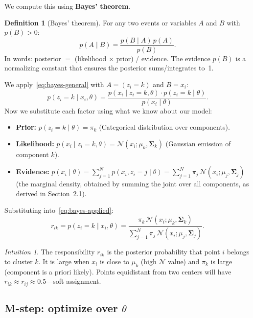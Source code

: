 \documentclass[11pt]{article}
\theoremstyle{definition}
\newtheorem{definition}{Definition}[section]
\theoremstyle{plain}
\theoremstyle{remark}
\newtheorem{intuition}{Intuition}[section]
\newcommand{\Sv}{\boldsymbol{\Sigma}}
\begin{document}
We compute this using \textbf{Bayes' theorem}.

\begin{definition}[Bayes' theorem]
For any two events or variables $A$ and $B$ with $p(B)>0$:
\begin{equation}
  p(A\mid B) = \frac{p(B\mid A)\,p(A)}{p(B)}.
  \label{eq:bayes-general}
\end{equation}
In words: posterior $=$ (likelihood $\times$ prior) / evidence. The evidence $p(B)$ is a normalizing constant that ensures the posterior sums/integrates to~1.
\end{definition}

We apply~\eqref{eq:bayes-general} with $A = (z_i=k)$ and $B = x_i$:
\begin{equation}
  p(z_i=k\mid x_i,\theta) = \frac{p(x_i\mid z_i=k,\theta)\cdot p(z_i=k\mid\theta)}{p(x_i\mid\theta)}.
  \label{eq:bayes-applied}
\end{equation}
Now we substitute each factor using what we know about our model:
\begin{itemize}[leftmargin=*,itemsep=2pt]
  \item \textbf{Prior:} $p(z_i=k\mid\theta) = \pi_k$ \quad (Categorical distribution over components).
  \item \textbf{Likelihood:} $p(x_i\mid z_i=k,\theta) = \mathcal{N}(x_i;\mu_k,\Sv_k)$ \quad (Gaussian emission of component $k$).
  \item \textbf{Evidence:} $p(x_i\mid\theta) = \sum_{j=1}^N p(x_i,z_i=j\mid\theta) = \sum_{j=1}^N \pi_j\,\mathcal{N}(x_i;\mu_j,\Sv_j)$ \quad (the marginal density, obtained by summing the joint over all components, as derived in Section~2.1).
\end{itemize}
Substituting into~\eqref{eq:bayes-applied}:
\begin{equation}
  r_{ik} = p(z_i=k\mid x_i,\theta) = \frac{\pi_k\,\mathcal{N}(x_i;\mu_k,\Sv_k)}{\sum_{j=1}^N \pi_j\,\mathcal{N}(x_i;\mu_j,\Sv_j)}.
  \label{eq:estep-gmm}
\end{equation}

\begin{intuition}
The responsibility $r_{ik}$ is the posterior probability that point $i$ belongs to cluster $k$. It is large when $x_i$ is close to $\mu_k$ (high $\mathcal{N}$ value) and $\pi_k$ is large (component is a priori likely). Points equidistant from two centers will have $r_{ik}\approx r_{ij}\approx 0.5$---soft assignment.
\end{intuition}

\subsection{M-step: optimize over $\theta$}
\end{document}
